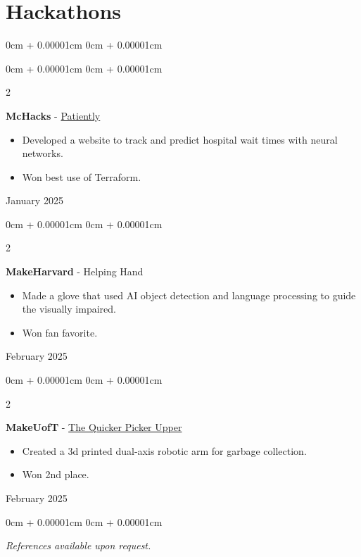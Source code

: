 \documentclass[10pt, letterpaper]{article}
\newenvironment{highlights}{
    \begin{itemize}[
        topsep=0.10cm,
        parsep=0.10cm,
        partopsep=0pt,
        itemsep=0pt,
        leftmargin=0cm + 10pt
    ]
}{
    \end{itemize}
}
\newenvironment{onecolentry}{
    \begin{adjustwidth}{
        0cm + 0.00001cm
    }{
        0cm + 0.00001cm
    }
}{
    \end{adjustwidth}
}
\newenvironment{twocolentry}[2][]{
    \onecolentry
    \def\secondColumn{#2}
    \setcolumnwidth{\fill, 5.5 cm} %
    \begin{paracol}{2}
}{
    \switchcolumn \raggedleft \secondColumn
    \end{paracol}
    \endonecolentry
}
\begin{document}
    \section{Hackathons}
    \begin{onecolentry}
        \begin{twocolentry}{January 2025}
            \textbf{McHacks} - \href{https://devpost.com/software/patiently-waiting}{Patiently}
            \begin{highlights}
            \item Developed a website to track and predict hospital wait times with neural networks. 
            \item Won best use of Terraform.
            \end{highlights}
            
        \end{twocolentry}

        \begin{twocolentry}{February 2025}
            \textbf{MakeHarvard} - Helping Hand 
            \begin{highlights}
            \item Made a glove that used AI object detection and language processing to guide the visually impaired. 
            \item Won fan favorite. 
            \end{highlights}
        \end{twocolentry}

        \begin{twocolentry}{February 2025}
            \textbf{MakeUofT} - \href{https://devpost.com/software/the-quicker-picker-upper}{The Quicker Picker Upper}
            \begin{highlights}
            \item Created a 3d printed dual-axis robotic arm for garbage collection. 
            \item Won 2nd place. 
            \end{highlights}
            
         \end{twocolentry}

    \end{onecolentry}

    \vspace{0.2cm}

    \begin{onecolentry}
        \textit{References available upon request.}
    \end{onecolentry}
\end{document}
